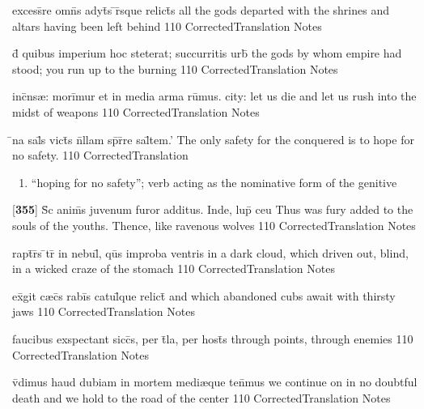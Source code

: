 \latline
  {excess\={}re omn\={}s adyt\={\macron {\i}}s \={}r\={\macron {\i}}sque relict\={\macron {\i}}s}
  { all the gods departed with the shrines and altars having been left behind }
  {110}
  { CorrectedTranslation }
  { Notes }


\latline
  {d\={\macron {\i}} quibus imperium hoc steterat; succurritis urb\={\macron {\i}}}
  { the gods by whom empire had stood; you run up to the burning  }
  {110}
  { CorrectedTranslation }
  { Notes }


\latline
  {inc\={}ns{\ae}: mori\={}mur et in media arma ru\={}mus.}
  { city: let us die and let us rush into the midst of weapons }
  {110}
  { CorrectedTranslation }
  { Notes }


\latline
  {\={}na sal\={}s vict\={\macron {\i}}s n\={}llam sp\={}r\={}re sal\={}tem.'}
  { The only safety for the conquered is to hope for no safety. }
  {110}
  { CorrectedTranslation }
  { \begin{enumerate}
  	\item ``hoping for no safety''; verb acting as the nominative form of the genitive
  \end{enumerate} }


\latline
  {[\textbf{355}] S\={\macron {\i}}c anim\={\macron {\i}}s juvenum furor additus.  Inde, lup\={\macron {\i}} ceu}
  { Thus was fury added to the souls of the youths.  Thence, like ravenous wolves }
  {110}
  { CorrectedTranslation }
  { Notes }


\latline
  {rapt\={}r\={}s \={}tr\={} in nebul\={}, qu\={}s improba ventris}
  { in a dark cloud, which driven out, blind, in  a wicked craze of the stomach  }
  {110}
  { CorrectedTranslation }
  { Notes }


\latline
  {ex\={}git c{\ae}c\={}s rabi\={}s catul\={\macron {\i}}que relict\={\macron {\i}}}
  { and which abandoned cubs await with thirsty jaws }
  {110}
  { CorrectedTranslation }
  { Notes }


\latline
  {faucibus exspectant sicc\={\macron {\i}}s, per t\={}la, per host\={\macron {\i}}s}
  { through points, through enemies }
  {110}
  { CorrectedTranslation }
  { Notes }


\latline
  {v\={}dimus haud dubiam in mortem medi{\ae}que ten\={}mus}
  { we continue on in no doubtful death and we hold to the road of the center }
  {110}
  { CorrectedTranslation }
  { Notes }



